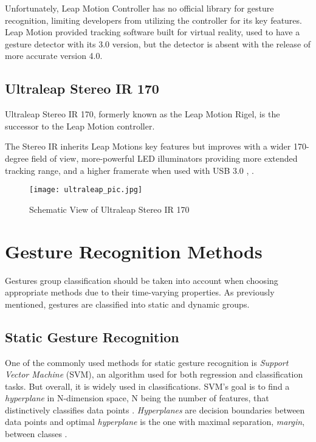Unfortunately, Leap Motion Controller has no official library for gesture recognition, limiting developers from utilizing the controller for its key features. Leap Motion provided tracking software built for virtual reality, used to have a gesture detector with its 3.0 version, but the detector is absent with the release of more accurate version 4.0.

\subsection{Ultraleap Stereo IR 170}

Ultraleap Stereo IR 170, formerly known as the Leap Motion Rigel, is the successor to the Leap Motion controller.

The Stereo IR inherits Leap Motions key features but improves with a wider 170-degree field of view, more-powerful LED illuminators providing more extended tracking range, and a higher framerate when used with USB 3.0 \cite{ultraleap}, \cite{ultraleap2}.

\begin{figure}[H]
	\centering
    \texttt{[image: ultraleap\_pic.jpg]}
	\caption{Schematic View of Ultraleap Stereo IR 170 \cite{ultraleap}}
	\label{fig:lmcScheme}
\end{figure}



\section{Gesture Recognition Methods
}

Gestures group classification should be taken into account when choosing appropriate methods due to their time-varying properties. As previously mentioned, gestures are classified into static and dynamic groups. 

\subsection{Static Gesture Recognition}

One of the commonly used methods for static gesture recognition is \textit{Support Vector Machine} (SVM), an algorithm used for both regression and classification tasks. But overall, it is widely used in classifications. SVM's goal is to find a \textit{hyperplane} in N-dimension space, N being the number of features, that distinctively classifies data points \cite{svmIntroToML}. \textit{Hyperplanes} are decision boundaries between data points and optimal \textit{hyperplane} is the one with maximal separation, \textit{margin}, between classes \cite{savaris}.

